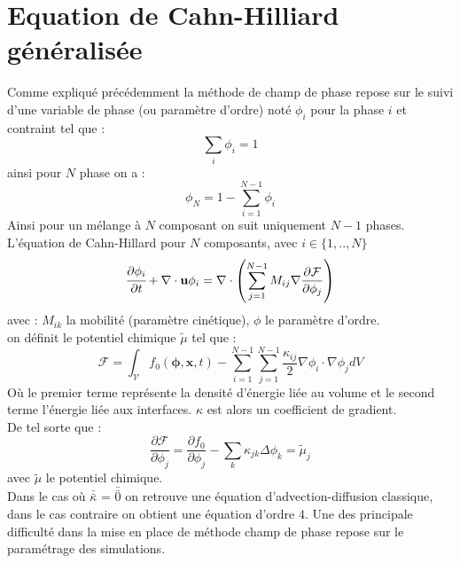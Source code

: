 \documentclass[a4paper,11pt]{report}    %
\newcommand{\doubleoverline}[1]{\bar{\bar{#1}}} 			%
\begin{document}
\section{Equation de Cahn-Hilliard généralisée}
Comme expliqué précédemment la méthode de champ de phase repose sur le suivi d'une variable de phase (ou paramètre d'ordre) noté $\phi_i$ pour la phase $i$ et contraint tel que : 
\begin{equation}
\sum_i \phi_i =1
\end{equation} 
ainsi pour $N$ phase on a :
\begin{equation}
\phi_N =1 - \sum_{i=1}^{N-1} \phi_i
\end{equation} 
Ainsi pour un mélange à $N$ composant on suit uniquement $N-1$ phases.
L'équation de Cahn-Hillard pour $N$ composants, avec $i\in \{1,..,N \}$
\begin{equation}
\cfrac{\partial \phi_i}{\partial t} + \nabla \cdot \mathbf{u}\phi_i=  \nabla \cdot \left(\sum_{j=1}^{N-1} M_{ij} \nabla \frac{\partial \mathcal{F}}{\partial \phi_j} \right)
\end{equation}
avec : $M_{ik}$ la mobilité (paramètre cinétique),  $\phi$ le paramètre d'ordre. \\
on définit le potentiel chimique $\tilde\mu$ tel que : \begin{equation}
\mathcal{F} = \int_{\mathcal{V}}f_0(\bm{\phi},\mathbf{x},t)- \sum_{i=1}^{N-1}\sum_{j=1}^{N-1}\frac{\kappa_{ij}}{2}\nabla \phi_i \cdot \nabla \phi_j dV
\end{equation}
Où le premier terme représente la densité d'énergie liée au volume et le second terme l'énergie liée aux interfaces. $\kappa$ est alors un coefficient de gradient. \\
De tel sorte que : 
\begin{equation}\label{eq_potentiel}
	\frac{\partial \mathcal{F}}{\partial \phi_j} = \frac{\partial f_0}{\partial \phi_j} -\sum_k \kappa_{jk} \Delta \phi_k = \tilde{\mu}_j
\end{equation}
avec $\tilde{\mu}$ le potentiel chimique. \\
Dans le cas où $\doubleoverline{\kappa}$ = $\doubleoverline{0}$ on retrouve une équation d'advection-diffusion classique, dans le cas contraire on obtient une équation d'ordre 4. Une des principale difficulté dans la mise en place de méthode champ de phase repose sur le paramétrage des simulations.
\end{document}

